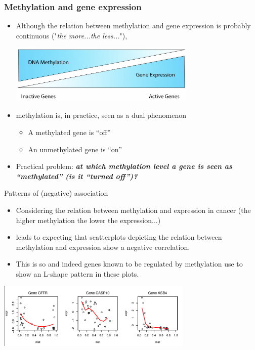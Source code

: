 \documentclass[handout]{beamer}
\begin{document}
\begin{frame}[fragile]\frametitle{Methylation and gene expression}
\begin{itemize}
\item Although the relation between methylation and gene expression is probably continuous ("\emph{the more...the less...}"),
\begin{center}
\includegraphics[width=0.7\textwidth]{./images/DNA-Methylation-and-Gene-Expression-Relationship.jpg}
\end{center}
\item methylation is, in practice, seen as a dual phenomenon
\begin{itemize}
\item A methylated gene is ``off''
\item An unmethylated gene is ``on''
\end{itemize}
\item Practical problem: \textbf{\emph{at which methylation level a gene is seen as ``methylated'' (is it ``turned off'')?}}
\end{itemize}

\end{frame}



\begin{frame}{Patterns of (negative) association}
  \begin{itemize}
  \item Considering the relation between methylation and expression in cancer (the higher methylation the lower the expression...)
\item leads to expecting that scatterplots depicting the relation between methylation and expression show a negative correlation.
\item This is so and indeed genes known to be regulated by methylation use to show an L-shape pattern in these plots.
  \end{itemize}
\begin{center}
\includegraphics[width=0.7\textwidth]{./images/Lshapes1.png}
\end{center}
\end{frame}
\end{document}
